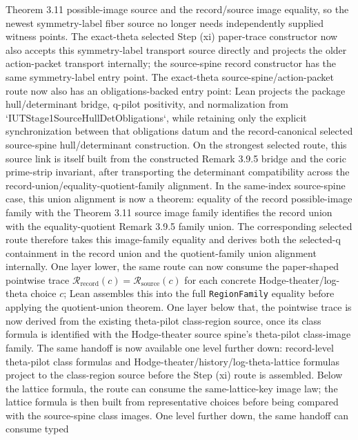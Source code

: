 \begin{proposition}
  Theorem 3.11 possible-image source and the record/source image equality, so
  the newest symmetry-label fiber source no longer needs independently supplied
  witness points.  The exact-theta selected Step (xi) paper-trace constructor
  now also accepts this symmetry-label transport source directly and projects
  the older action-packet transport internally; the source-spine record
  constructor has the same symmetry-label entry point.  The exact-theta
  source-spine/action-packet route now also has an obligations-backed entry
  point: Lean projects the package hull/determinant bridge, q-pilot positivity,
  and normalization from `IUTStage1SourceHullDetObligations`, while retaining
  only the explicit synchronization between that obligations datum and the
  record-canonical selected source-spine hull/determinant construction.
  On
  the strongest selected route, this
  source link is itself built from the constructed Remark 3.9.5 bridge and the
  coric prime-strip
  invariant, after transporting the determinant compatibility across the
  record-union/equality-quotient-family alignment.  In the same-index
  source-spine case, this union alignment is now a theorem: equality of the
  record possible-image family with the Theorem 3.11 source image family
  identifies the record union with the equality-quotient Remark 3.9.5 family
  union.  The corresponding selected route therefore takes this image-family
  equality and derives both the selected-q containment in the record union and
  the quotient-family union alignment internally.  One layer lower, the same
  route can now consume the paper-shaped pointwise trace
  \(\mathcal R_{\mathrm{record}}(c)=\mathcal R_{\mathrm{source}}(c)\) for
  each concrete Hodge-theater/log-theta choice \(c\); Lean assembles this into
  the full \texttt{RegionFamily} equality before applying the quotient-union
  theorem.  One layer below that, the pointwise trace is now derived from the
  existing theta-pilot class-region source, once its class formula is identified
  with the Hodge-theater source spine's theta-pilot class-image family.  The
  same handoff is now available one level further down: record-level
  theta-pilot class formulas and Hodge-theater/history/log-theta-lattice
  formulas project to the class-region source before the Step (xi) route is
  assembled.  Below the lattice formula, the route can consume the
  same-lattice-key image law; the lattice formula is then built from
  representative choices before being compared with the source-spine class
  images.  One level further down, the same handoff can consume typed

\end{proposition}
